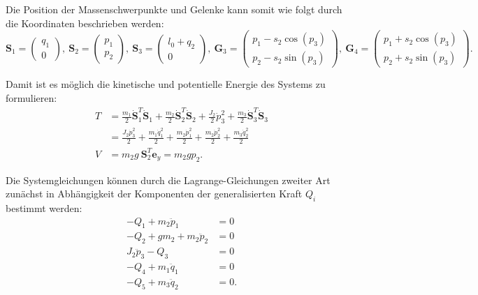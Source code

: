Die Position der Massenschwerpunkte und Gelenke kann somit wie folgt durch die Koordinaten beschrieben werden:
\begin{equation}
	\mathbf{S}_1 =
	\begin{pmatrix}
		q_1 \\
		0
	\end{pmatrix}, 
	\
	\mathbf{S}_2 =
	\begin{pmatrix}
		p_1 \\
		p_2
	\end{pmatrix},
	\
	\mathbf{S}_3 =
	\begin{pmatrix}
		l_0 + q_2 \\
		0
	\end{pmatrix},
	\
	\mathbf{G}_3 =
	\left(\begin{matrix}
		p_{1} - s_{2} \cos{\left(p_{3} \right)}\\
		p_{2} - s_{2} \sin{\left(p_{3} \right)}
	\end{matrix}\right),
	\
	\mathbf{G}_4 =
	\left(\begin{matrix}
		p_{1} + s_{2} \cos{\left(p_{3} \right)}\\
		p_{2} + s_{2} \sin{\left(p_{3} \right)}
	\end{matrix}\right).
\end{equation}

Damit ist es möglich die kinetische und potentielle Energie des Systems zu formulieren:
\begin{align}
	T &= \frac{m_1}{2} \dot{\mathbf{S}}_1^T \dot{\mathbf{S}}_1 + \frac{m_2}{2} \dot{\mathbf{S}}_2^T \dot{\mathbf{S}}_2 + \frac{J_2}{2} \dot{p}_3^2 + \frac{m_3}{2} \dot{\mathbf{S}}_3^T \dot{\mathbf{S}}_3 \nonumber \\  
	&= \frac{J_{2} \dot{p}_{3}^{2}}{2} + \frac{m_{1} \dot{q}_{1}^{2}}{2} + \frac{m_{2} \dot{p}_{1}^{2}}{2} + \frac{m_{2} \dot{p}_{2}^{2}}{2} + \frac{m_{3} \dot{q}_{2}^{2}}{2} \\
	V &= m_2 g \ \mathbf{S}_2^T \mathbf{e}_y = m_{2} g p_{2}.
\end{align}

Die Systemgleichungen können durch die Lagrange-Gleichungen zweiter Art zunächst in Abhängigkeit der Komponenten der generalisierten Kraft $Q_i$ bestimmt werden:
\begin{align}
	- Q_{1} + m_{2} \ddot{p}_{1} &= 0\\
	- Q_{2} + g m_{2} + m_{2} \ddot{p}_{2} &= 0\\
	J_{2} \ddot{p}_{3} - Q_{3} &= 0\\
	- Q_{4} + m_{1} \ddot{q}_{1} &= 0\\
	- Q_{5} + m_{3} \ddot{q}_{2} &= 0.
\end{align}

